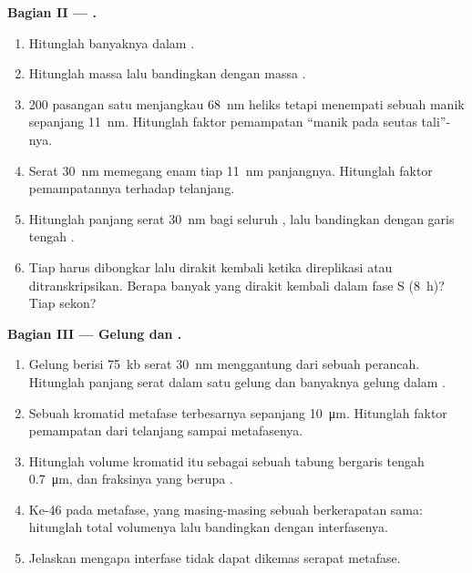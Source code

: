 \begin{problem}
\medskip
\noindent\textbf{Bagian II --- .}
\begin{enumerate}[resume]
  \item Hitunglah banyaknya  dalam .
  \item Hitunglah massa  lalu bandingkan dengan massa .
  \item \qty{200}{} pasangan satu  menjangkau \qty{68}{nm}
        heliks tetapi menempati sebuah manik sepanjang \qty{11}{nm}.
        Hitunglah faktor pemampatan ``manik pada seutas tali''-nya.
  \item Serat \qty{30}{nm} memegang enam  tiap \qty{11}{nm}
        panjangnya. Hitunglah faktor pemampatannya terhadap 
        telanjang.
  \item Hitunglah panjang serat \qty{30}{nm} bagi seluruh ,
        lalu bandingkan dengan garis tengah .
  \item Tiap  harus dibongkar lalu dirakit kembali ketika
         direplikasi atau ditranskripsikan. Berapa banyak
         yang dirakit kembali dalam fase S (\qty{8}{h})? Tiap
        sekon?
\end{enumerate}

\medskip
\noindent\textbf{Bagian III --- Gelung dan .}
\begin{enumerate}[resume]
  \item Gelung berisi \qty{75}{kb} serat \qty{30}{nm} menggantung dari
        sebuah perancah. Hitunglah panjang serat dalam satu gelung dan
        banyaknya gelung dalam .
  \item Sebuah kromatid metafase  terbesarnya sepanjang
        \qty{10}{\micro m}. Hitunglah faktor pemampatan dari 
        telanjang sampai  metafasenya.
  \item Hitunglah volume kromatid itu sebagai sebuah tabung bergaris
        tengah \qty{0.7}{\micro m}, dan fraksinya yang berupa .
  \item Ke-46  pada metafase, yang masing-masing sebuah 
        berkerapatan sama: hitunglah total volumenya lalu bandingkan
        dengan  interfasenya.
  \item Jelaskan mengapa  interfase tidak dapat dikemas
        serapat  metafase.
\end{enumerate}


\end{problem}
